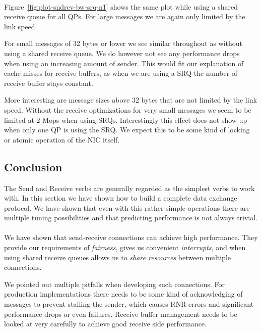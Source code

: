 \paragraph{} Figure~\ref{fig:plot-sndrcv-bw-srq-n1} shows the same plot while using a shared receive queue for all QPs. For
large messages we are again only limited by the link speed.

For small messages of 32 bytes or lower we see similar throughout
as without using a shared receive queue. We do however not see any performance drops when using an increasing amount of sender.
This would fit our explanation of cache misses for receive buffers, as when we are using a SRQ the number of receive buffer
stays constant. 


More interesting are message sizes above 32 bytes that are not limited by the link speed. Without the receive optimizations 
for very small messages we seem to be limited at 2 Mops when using SRQs. Interestingly this effect does not show up when only
one QP is using the SRQ. We expect this to be some kind of locking or atomic operation of the NIC itself.





\subsection{Conclusion}

The Send and Receive verbs are generally regarded as the simplest verbs to work with. In this section we have shown how to
build a complete data exchange protocol. We have shown that even with this rather simple operations there are multiple tuning
possibilities and that predicting performance  is not always trivial.

\paragraph{} We have shown that send-receive connections can achieve high performance. They provide our requirements of \emph{fairness},
gives us convenient \emph{interrupts}, and when using shared receive queues allows us to \emph{share resources} between multiple 
connections.

We pointed out multiple pitfalls when developing such connections. For production implementations there needs
to be some kind of acknowledging of messages to prevent stalling the sender, which causes RNR errors and significant 
performance drops or even failures. Receive buffer management needs to be looked at very carefully to achieve good receive
side performance.

